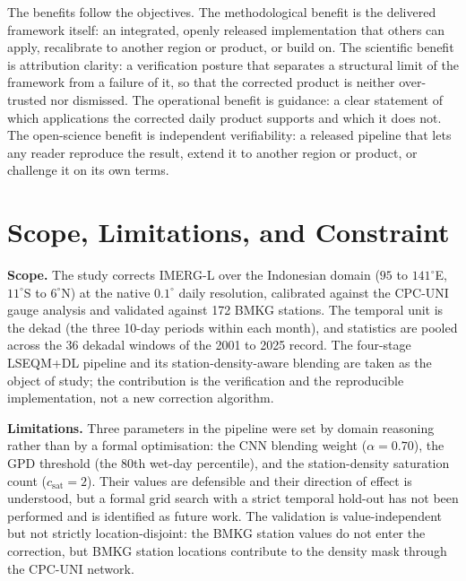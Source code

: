 The benefits follow the objectives. The methodological benefit is
the delivered framework itself: an integrated, openly released
implementation that others can apply, recalibrate to another
region or product, or build on. The scientific benefit is
attribution clarity: a verification posture that separates a
structural limit of the framework from a failure of it, so that
the corrected product is neither over-trusted nor dismissed. The
operational benefit is guidance: a clear statement of which
applications the corrected daily product supports and which it
does not. The open-science benefit is independent verifiability:
a released pipeline that lets any reader reproduce the result,
extend it to another region or product, or challenge it on its
own terms.


\section{Scope, Limitations, and Constraint}\label{sec:intro-scope}

\medskip\noindent\textbf{Scope.}
The study corrects IMERG-L over the Indonesian domain
($95$ to $141^{\circ}$E, $11^{\circ}$S to $6^{\circ}$N) at the
native $0.1^{\circ}$ daily resolution, calibrated against the
CPC-UNI gauge analysis and validated against 172 BMKG stations.
The temporal unit is the dekad (the three 10-day periods within
each month), and statistics are pooled across the 36 dekadal
windows of the 2001 to 2025 record. The four-stage LSEQM+DL
pipeline and its station-density-aware blending are taken as the
object of study; the contribution is the verification and the
reproducible implementation, not a new correction algorithm.

\medskip\noindent\textbf{Limitations.}
Three parameters in the pipeline were set by domain reasoning
rather than by a formal optimisation: the CNN blending weight
($\alpha = 0.70$), the GPD threshold (the $80$th wet-day
percentile), and the station-density saturation count
($c_{\text{sat}} = 2$). Their values are defensible and their
direction of effect is understood, but a formal grid search with
a strict temporal hold-out has not been performed and is
identified as future work. The validation is value-independent
but not strictly location-disjoint: the BMKG station values do
not enter the correction, but BMKG station locations contribute
to the density mask through the CPC-UNI network.

